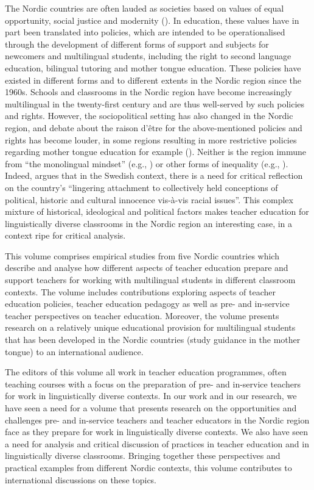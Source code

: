 \documentclass[output=paper]{langscibook}
\begin{document}
The Nordic countries are often lauded as societies based on values of equal opportunity, social justice and modernity (\citealt{BlossingEtAl2014}). In education, these values have in part been translated into policies, which are intended to be operationalised through the development of different forms of support and subjects for newcomers and multilingual students, including the right to second language education, bilingual tutoring and mother tongue education. These policies have existed in different forms and to different extents in the Nordic region since the 1960s. Schools and classrooms in the Nordic region have become increasingly multilingual in the twenty-first century and are thus well-served by such policies and rights. However, the sociopolitical setting has also changed in the Nordic region, and debate about the raison d'être for the above-mentioned policies and rights has become louder, in some regions resulting in more restrictive policies regarding mother tongue education for example (\citealt{AlisaariEtAl2023}). Neither is the region immune from “the monolingual mindset” (e.g., \citealt{HermanssonEtAl2022}) or other forms of inequality (e.g., \citealt{Peterson2022}). Indeed, \citet[100]{Habel2012} argues that in the Swedish context, there is a need for critical reflection on the country’s “lingering attachment to collectively held conceptions of political, historic and cultural innocence vis-à-vis racial issues”. This complex mixture of historical, ideological and political factors makes teacher education for linguistically diverse classrooms in the Nordic region an interesting case, in a context ripe for critical analysis.

This volume comprises empirical studies from five Nordic countries which describe and analyse how different aspects of teacher education prepare and support teachers for working with multilingual students in different classroom contexts. The volume includes contributions exploring aspects of teacher education policies, teacher education pedagogy as well as pre- and in-service teacher perspectives on teacher education. Moreover, the volume presents research on a relatively unique educational provision for multilingual students that has been developed in the Nordic countries (study guidance in the mother tongue) to an international audience.

The editors of this volume all work in teacher education programmes, often teaching courses with a focus on the preparation of pre- and in-service teachers for work in linguistically diverse contexts. In our work and in our research, we have seen a need for a volume that presents research on the opportunities and challenges pre- and in-service teachers and teacher educators in the Nordic region face as they prepare for work in linguistically diverse contexts. We also have seen a need for analysis and critical discussion of practices in teacher education and in linguistically diverse classrooms. Bringing together these perspectives and practical examples from different Nordic contexts, this volume contributes to international discussions on these topics. 
\end{document}
